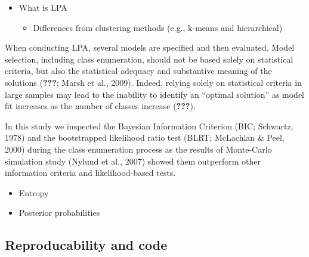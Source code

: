 \documentclass[
  english,
  man,floatsintext]{apa7}
\providecommand{\tightlist}{%
  \setlength{\itemsep}{0pt}\setlength{\parskip}{0pt}}
\begin{document}
\begin{itemize}
\tightlist
\item
  What is LPA

  \begin{itemize}
  \tightlist
  \item
    Differences from clustering methods (e.g., k-means and hierarchical)
  \end{itemize}
\end{itemize}

When conducting LPA, several models are specified and then evaluated. Model selection, including class enumeration, should not be based solely on statistical criteria, but also the statistical adequacy and substantive meaning of the solutions ({\textbf{???}}; Marsh et al., 2009). Indeed, relying solely on statistical criteria in large samples may lead to the inability to identify an \enquote{optimal solution} as model fit increases as the number of classes increase ({\textbf{???}}).

In this study we inspected the Bayesian Information Criterion (BIC; Schwartz, 1978) and the bootstrapped likelihood ratio test (BLRT; McLachlan \& Peel, 2000) during the class enumeration process as the results of Monte-Carlo simulation study (Nylund et al., 2007) showed them outperform other information criteria and likelihood-based tests.

\begin{itemize}
\tightlist
\item
  Entropy
\item
  Posterior probabilities
\end{itemize}

\hypertarget{reproducability-and-code}{%
\subsection{Reproducability and code}\label{reproducability-and-code}}
\end{document}
